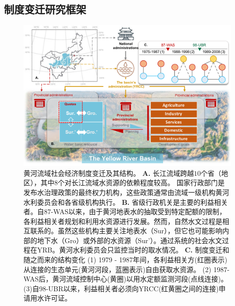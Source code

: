 
\subsection{制度变迁研究框架}\label{results-1}

\begin{figure}[!t]
	\includegraphics[width=\linewidth]{img/ch5/diagram.pdf}
	\caption[黄河流域社会经济制度变迁及其结构]{
		黄河流域社会经济制度变迁及其结构。
		\textbf{A.} 长江流域跨越$10$个省（地区），其中$8$个对长江流域水资源的依赖程度较高。
		国家行政部门是发布水治理政策的最终权力机构，这些政策通常由流域一级机构黄河水利委员会和各省级机构执行。
		\textbf{B.} 省级行政机关是主要的利益相关者。自87-WAS以来，由于黄河地表水的抽取受到特定配额的限制，各利益相关者规划和利用水资源进行发展。然而，自然水文过程是相互联系的。虽然这些机构主要关注地表水（Sur），但它也可能影响内部的地下水（Gro）或外部的水资源（Sur'）。通过系统的社会水文过程在YRB。黄河水利委员会只监控当时的取水情况。
		\textbf{C.} 制度变迁和随之而来的结构变化
		(1) 1979 - 1987年间，各利益相关方(红圈表示)从连接的生态单元(黄河河段，蓝圈表示)自由获取水资源。
		(2) 1987-WAS后，黄河流域控制中心(黄圈)以用水定额监测河段(点线连接)。
		(3)自98-UBR以来，利益相关者必须向YRCC(红黄圈之间的连接)申请用水许可证。
	}\label{fig:structure}
\end{figure}

